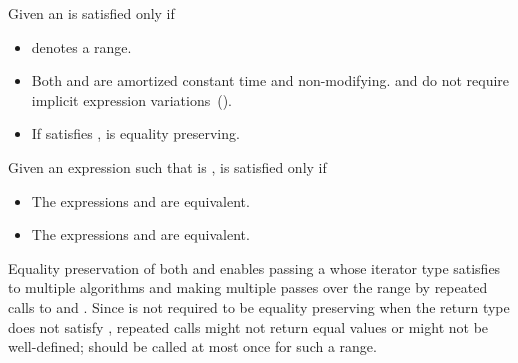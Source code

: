 \begin{itemdescr}
\pnum
Given an  is satisfied only if

\begin{itemize}
\item {} denotes a range.

\item Both  and  are amortized constant time
and non-modifying. \enternote {} and  do not require
implicit expression variations~(). \exitnote

\item If  satisfies ,
 is equality preserving.
\end{itemize}

\begin{addedblock}
\pnum
Given an expression  such that  is ,
 is satisfied only if
\begin{itemize}
\item
  The expressions  and 
  are equivalent.

\item
  The expressions  and 
  are equivalent.
\end{itemize}

\end{addedblock}
\end{itemdescr}

\pnum \enternote
Equality preservation of both  and  enables passing a 
whose iterator type satisfies 
to multiple algorithms and
making multiple passes over the range by repeated calls to  and .
Since  is not required to be equality preserving when the return type does
not satisfy , repeated calls might not return equal values or
might not be well-defined;  should be called at most once for such a range.
\exitnote


